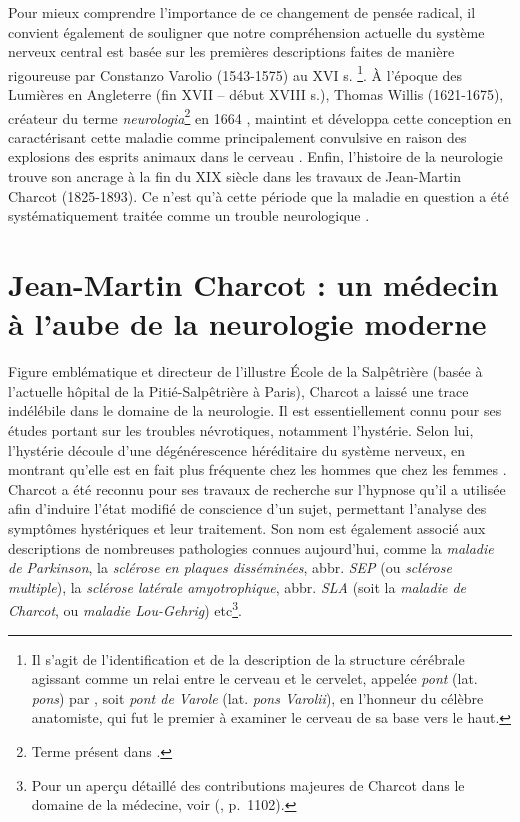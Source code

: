 Pour mieux comprendre l'importance de ce changement de pensée radical, il convient également de souligner que notre compréhension actuelle du système nerveux central est basée sur les premières descriptions faites de manière rigoureuse par Constanzo Varolio (1543-1575) au XVI\ieme{} s. \citep[p.~734]{tubbs2008costanzo}\footnote{Il s'agit de l'identification et de la description de la structure cérébrale agissant comme un relai entre le cerveau et le cervelet, appelée \textit{pont} (lat. \textit{pons}) par \citet{varolio1969nervis}, soit \textit{pont de Varole} (lat. \textit{pons Varolii}), en l'honneur du célèbre anatomiste, qui fut le premier à examiner le cerveau de sa base vers le haut.  
}. À l'époque des Lumières en Angleterre (fin XVII\ieme{} -- début XVIII\ieme{} s.), Thomas Willis (1621-1675), créateur du terme \textit{neurologia}\footnote{Terme présent dans \citet{willis1664cerebri}.} en 1664 \citep[p.~2]{monteiro2021}, maintint et développa cette conception en caractérisant cette maladie comme principalement convulsive en raison des explosions des \og{}esprits animaux\fg{} dans le cerveau \citep[p.~1]{willis1681essay}. Enfin, l'histoire de la neurologie trouve son ancrage à la fin du XIX\ieme{} siècle dans les travaux de Jean-Martin Charcot (1825-1893). Ce n'est qu'à cette période que la maladie en question a été systématiquement traitée comme un trouble neurologique \citep[p.~114]{tasca2012women}. 

\section{Jean-Martin Charcot : un médecin à l'aube de la neurologie moderne}
\label{JMC_polymathe}

Figure emblématique et directeur de l'illustre École de la Salpêtrière (basée à l'actuelle hôpital de la Pitié-Salpêtrière à Paris), Charcot a laissé une trace indélébile dans le domaine de la neurologie. 
Il est essentiellement connu pour ses études portant sur les troubles névrotiques, notamment l'hystérie. Selon lui, l'hystérie découle d'une dégénérescence héréditaire du système nerveux, en montrant qu'elle est en fait plus fréquente chez les hommes que chez les femmes \citep[p.~114]{tasca2012women}. Charcot a été reconnu pour ses travaux de recherche sur l'hypnose qu'il a utilisée afin d'induire l'état modifié de conscience d'un sujet, permettant l'analyse des symptômes hystériques et leur traitement. 
Son nom est également associé aux descriptions de nombreuses pathologies connues aujourd'hui, comme la \textit{maladie de Parkinson}, la \textit{sclérose en plaques disséminées}, abbr. \textit{SEP} (ou \textit{sclérose multiple}), la \textit{sclérose latérale amyotrophique}, abbr. \textit{SLA} (soit la \textit{maladie de Charcot}, ou \textit{maladie Lou-Gehrig}) etc\footnote{Pour un aperçu détaillé des contributions majeures de Charcot dans le domaine de la médecine, voir \citeauthor{camargo2024} (\citeyear{camargo2024}, p.~1102).}.

